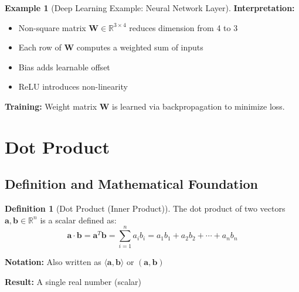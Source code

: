 \documentclass[12pt,a4paper]{article}
\theoremstyle{definition}
\newtheorem{definition}{Definition}[section]
\newtheorem{example}{Example}[section]
\begin{document}
\begin{example}[Deep Learning Example: Neural Network Layer]
\textbf{Interpretation:}
\begin{itemize}
    \item Non-square matrix $\mathbf{W} \in \mathbb{R}^{3 \times 4}$ reduces dimension from 4 to 3
    \item Each row of $\mathbf{W}$ computes a weighted sum of inputs
    \item Bias adds learnable offset
    \item ReLU introduces non-linearity
\end{itemize}

\textbf{Training:} Weight matrix $\mathbf{W}$ is learned via backpropagation to minimize loss.
\end{example}

\newpage
\section{Dot Product}

\subsection{Definition and Mathematical Foundation}

\begin{definition}[Dot Product (Inner Product)]
The dot product of two vectors $\mathbf{a}, \mathbf{b} \in \mathbb{R}^n$ is a scalar defined as:
\begin{equation}
\mathbf{a} \cdot \mathbf{b} = \mathbf{a}^T\mathbf{b} = \sum_{i=1}^{n} a_i b_i = a_1b_1 + a_2b_2 + \cdots + a_nb_n
\end{equation}

\textbf{Notation:} Also written as $\langle \mathbf{a}, \mathbf{b} \rangle$ or $(\mathbf{a}, \mathbf{b})$

\textbf{Result:} A single real number (scalar)
\end{definition}
\end{document}
